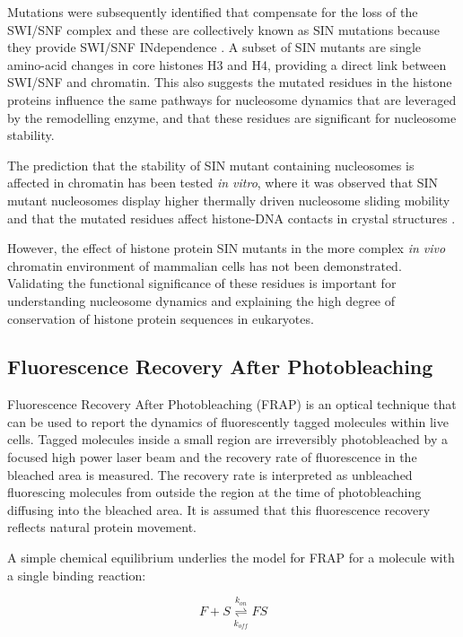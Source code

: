     Mutations were subsequently identified that compensate for the
    loss of the SWI/SNF complex and these are collectively known as SIN
    mutations because they provide SWI/SNF INdependence
    \citep{kruger1995amino}.  A subset of SIN mutants are single
    amino-acid changes in core histones H3 and H4, providing a direct
    link between SWI/SNF and chromatin.  This also suggests the
    mutated residues in the histone proteins influence the same
    pathways for nucleosome dynamics that are leveraged
    by the remodelling enzyme, and that
    these residues are significant for nucleosome stability.

    The prediction that the stability of SIN mutant containing
    nucleosomes is affected in chromatin has been tested \textit{in vitro},
    where it was observed that SIN mutant nucleosomes display higher
    thermally driven nucleosome sliding mobility \citep{flaus2004sin}
    and that the mutated residues affect histone-DNA contacts in
    crystal structures \citep{muthurajan2004crystal}.

    However, the effect of histone protein SIN mutants
    in the more complex \textit{in vivo} chromatin environment
    of mammalian cells has not been demonstrated.
    Validating the functional significance of these residues
    is important for understanding nucleosome dynamics and
    explaining the high degree of conservation of
    histone protein sequences in eukaryotes.

  \subsection{Fluorescence Recovery After Photobleaching}

    Fluorescence Recovery After Photobleaching (FRAP) is an optical technique
    that can be used to report the dynamics of fluorescently
    tagged molecules within live cells.
    Tagged molecules inside a small region are irreversibly photobleached by
    a focused high power laser beam and the recovery rate of fluorescence
    in the bleached area is measured. The recovery rate is interpreted
    as unbleached fluorescing molecules from outside the region
    at the time of photobleaching diffusing into the bleached area.
    It is assumed that this fluorescence recovery
    reflects natural protein movement.

    A simple chemical equilibrium underlies the model for FRAP for a
    molecule with a single binding reaction:

    \begin{displaymath}
      F + S \overset{k_{on}}{\underset{k_{off}}{\rightleftharpoons}} FS
    \end{displaymath}

